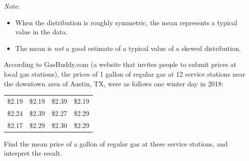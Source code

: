 \documentclass[../mathNotesPreamble]{subfiles}
\begin{document}
  \begin{thmBox*}
    \emph{Note}:
    \begin{itemize}
      \item When the distribution is roughly symmetric, the mean represents a typical value in the data.
      \item The mean is \emph{not} a good estimate of a typical value of a skewed distribution.
    \end{itemize}
  \end{thmBox*}
  \begin{ex*}
    According to GasBuddy.com (a website that invites people to submit prices at local gas stations), the prices of 1 gallon of regular gas at 12 service stations near the downtown area of Austin, TX, were as follows one winter day in 2018:
    \vspace*{\baselineskip}

    \noindent
    \begin{minipage}{0.4\linewidth}
      \begin{center}
        \begin{tabular}{@{}*{4}{c}@{}}\toprule
          \$2.19 & \$2.19 & \$2.39 & \$2.19 \\
          \$2.24 & \$2.39 & \$2.27 & \$2.29 \\
          \$2.17 & \$2.29 & \$2.30 & \$2.29 \\\bottomrule
        \end{tabular}
      \end{center}
    \end{minipage}
    \begin{minipage}{0.6\linewidth}
      \centering
    \end{minipage}
    \vspace*{\baselineskip}

    Find the mean price of a gallon of regular gas at these service stations, and interpret the result.
  \end{ex*}
  \pagebreak
\end{document}
